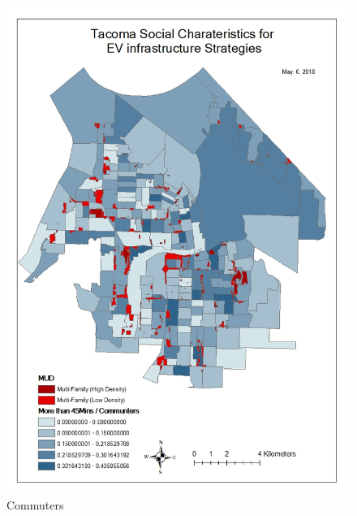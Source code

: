 \documentclass[]{article}
\begin{document}
\begin{figure}
\centering
\includegraphics{./figs/commute.jpg}
\caption{Commuters}
\end{figure}
\end{document}
